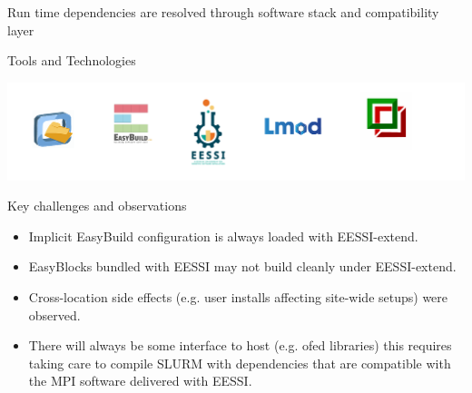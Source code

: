 \documentclass[final]{beamer}
\begin{document}
\begin{frame}[t]
\begin{columns}[t]
\begin{column}{0.63\textwidth}
      \begin{block}{Run time dependencies are resolved through software stack and compatibility layer}
        
      \end{block}


      \begin{block}{Tools and Technologies}
        \begin{center}
            \includegraphics[width=561mm]{./include/logos.pdf}
        \end{center}
      \end{block}

      \begin{block} {Key challenges and observations}
          \begin{itemize}
            \item Implicit EasyBuild configuration is always loaded with EESSI-extend.
            \item EasyBlocks bundled with EESSI may not build cleanly under EESSI-extend.
            \item Cross-location side effects (e.g. user installs affecting site-wide setups) were observed.
            \item There will always be some interface to host (e.g. ofed
                libraries) this requires taking care to compile SLURM with
                  dependencies that are compatible with the MPI software
                  delivered with EESSI.
          \end{itemize}
      \end{block}

  \end{column}
\end{columns}

\end{frame}
\end{document}
